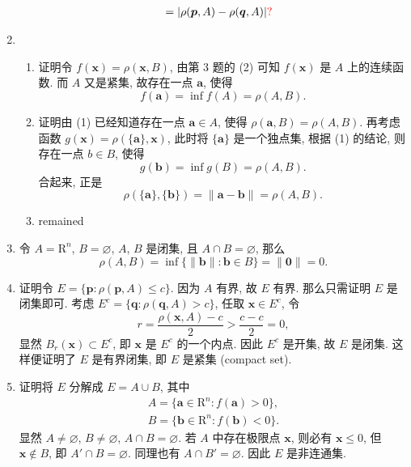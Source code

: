 \begin{enumerate}
\begin{enumerate}[(1)]
\begin{align*}
                    &= |\rho(\boldsymbol{p}, A) - \rho(\boldsymbol{q}, A)|{\color{red} ?}
                \end{align*}
        \end{enumerate}
    \item %
        \begin{enumerate}[(1)]
            \item %
                {\heiti 证明}\quad 令 $f(\boldsymbol{x}) = \rho(\boldsymbol{x}, B)$, 由第 3 题的 (2) 可知 $f(\boldsymbol{x})$ 是 $A$ 上的连续函数.
                而 $A$ 又是紧集, 故存在一点 $\boldsymbol{a}$, 使得
                \[
                    f(\boldsymbol{a}) = \inf{f(A)} = \rho(A, B).    
                \]
            \item %
                {\heiti 证明}\quad 由 (1) 已经知道存在一点 $\boldsymbol{a} \in A$, 使得 $\rho(\boldsymbol{a}, B) = \rho(A, B)$.
                再考虑函数 $g(\boldsymbol{x}) = \rho(\{\boldsymbol{a}\}, \boldsymbol{x})$, 此时将 $\{\boldsymbol{a}\}$ 是一个独点集, 根据 (1) 的结论, 则
                存在一点 $b \in B$, 使得
                \[
                    g(\boldsymbol{b}) = \inf{g(B)} = \rho(A, B).     
                \]
                合起来, 正是
                \[
                    \rho(\{\boldsymbol{a}\}, \{\boldsymbol{b}\}) = \|\boldsymbol{a} - \boldsymbol{b}\| = \rho(A, B).    
                \]
            \item %
                {\color{red} remained}
        \end{enumerate}
    \item %
        令 $A = \mathrm{R}^n$, $B = \varnothing$, $A$, $B$ 是闭集, 且 $A \cap B = \varnothing$, 那么
        \[
            \rho(A, B) = \inf\{\|\boldsymbol{b}\|: \boldsymbol{b} \in B\} = \|\boldsymbol{0}\| = 0.  
        \]
    \item %
        {\heiti 证明}\quad 令 $E = \{\boldsymbol{p} : \rho(\boldsymbol{p}, A) \leqslant c\}$. 因为 $A$ 有界, 故 $E$ 有界.
        那么只需证明 $E$ 是闭集即可. 考虑 $E^c = \{\boldsymbol{q} : \rho(\boldsymbol{q}, A) > c\}$, 任取 $\boldsymbol{x} \in E^c$, 令
        \[
            r = \frac{\rho(\boldsymbol{x}, A) - c}{2} > \frac{c - c}{2} = 0,    
        \]
        显然 $B_r(\boldsymbol{x}) \subset E^c$, 即 $\boldsymbol{x}$ 是 $E^c$ 的一个内点. 因此 $E^c$ 是开集, 故 $E$ 是闭集.
        这样便证明了 $E$ 是有界闭集, 即 $E$ 是紧集 (compact set).
    \item %
        {\heiti 证明}\quad 将 $E$ 分解成 $E = A \cup B$, 其中
        \begin{align*}
            A = \{\boldsymbol{a} \in \mathrm{R}^n : f(\boldsymbol{a}) > 0\}, \\
            B = \{\boldsymbol{b} \in \mathrm{R}^n : f(\boldsymbol{b}) < 0\}.    
        \end{align*}
        显然 $A \neq \varnothing$, $B \neq \varnothing$, $A \cap B = \varnothing$. 若 $A$ 中存在极限点 $\boldsymbol{x}$, 则必有 $\boldsymbol{x} \leqslant 0$,
        但 $\boldsymbol{x} \notin B$, 即 $A' \cap B = \varnothing$. 同理也有 $A \cap B' = \varnothing$. 因此 $E$ 是非连通集.
\end{enumerate}
% 